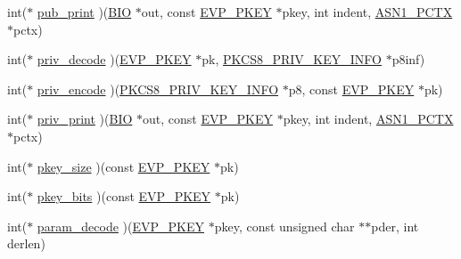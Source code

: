 \begin{DoxyCompactItemize}
\item 
int($\ast$ \hyperlink{structevp__pkey__asn1__method__st_a1ec3f6da35f0cdd500d677123b044d33}{pub\+\_\+print} )(\hyperlink{crypto_2bio_2bio_8h_af3fabae1c9af50b9312cdff41e11d1dd}{B\+IO} $\ast$out, const \hyperlink{crypto_2ossl__typ_8h_a2fca4fef9e4c7a2a739b1ea04acb56ce}{E\+V\+P\+\_\+\+P\+K\+EY} $\ast$pkey, int indent, \hyperlink{crypto_2ossl__typ_8h_a88063a1a0d89cda63e8a53c271225bd3}{A\+S\+N1\+\_\+\+P\+C\+TX} $\ast$pctx)
\item 
int($\ast$ \hyperlink{structevp__pkey__asn1__method__st_a2744e6bc2473d3d562cfba707a35e617}{priv\+\_\+decode} )(\hyperlink{crypto_2ossl__typ_8h_a2fca4fef9e4c7a2a739b1ea04acb56ce}{E\+V\+P\+\_\+\+P\+K\+EY} $\ast$pk, \hyperlink{crypto_2ossl__typ_8h_ab3798ffddfb54398657269e656dcf0d3}{P\+K\+C\+S8\+\_\+\+P\+R\+I\+V\+\_\+\+K\+E\+Y\+\_\+\+I\+N\+FO} $\ast$p8inf)
\item 
int($\ast$ \hyperlink{structevp__pkey__asn1__method__st_a87fb532b7fc31dd31a480a66f8a0300e}{priv\+\_\+encode} )(\hyperlink{crypto_2ossl__typ_8h_ab3798ffddfb54398657269e656dcf0d3}{P\+K\+C\+S8\+\_\+\+P\+R\+I\+V\+\_\+\+K\+E\+Y\+\_\+\+I\+N\+FO} $\ast$p8, const \hyperlink{crypto_2ossl__typ_8h_a2fca4fef9e4c7a2a739b1ea04acb56ce}{E\+V\+P\+\_\+\+P\+K\+EY} $\ast$pk)
\item 
int($\ast$ \hyperlink{structevp__pkey__asn1__method__st_ae349b3ea59e0f76e051467114990ff96}{priv\+\_\+print} )(\hyperlink{crypto_2bio_2bio_8h_af3fabae1c9af50b9312cdff41e11d1dd}{B\+IO} $\ast$out, const \hyperlink{crypto_2ossl__typ_8h_a2fca4fef9e4c7a2a739b1ea04acb56ce}{E\+V\+P\+\_\+\+P\+K\+EY} $\ast$pkey, int indent, \hyperlink{crypto_2ossl__typ_8h_a88063a1a0d89cda63e8a53c271225bd3}{A\+S\+N1\+\_\+\+P\+C\+TX} $\ast$pctx)
\item 
int($\ast$ \hyperlink{structevp__pkey__asn1__method__st_ae7d7e837164cb9faaf4f5fee73be26b0}{pkey\+\_\+size} )(const \hyperlink{crypto_2ossl__typ_8h_a2fca4fef9e4c7a2a739b1ea04acb56ce}{E\+V\+P\+\_\+\+P\+K\+EY} $\ast$pk)
\item 
int($\ast$ \hyperlink{structevp__pkey__asn1__method__st_ace4959fec88f00dc280d3bca7376e3db}{pkey\+\_\+bits} )(const \hyperlink{crypto_2ossl__typ_8h_a2fca4fef9e4c7a2a739b1ea04acb56ce}{E\+V\+P\+\_\+\+P\+K\+EY} $\ast$pk)
\item 
int($\ast$ \hyperlink{structevp__pkey__asn1__method__st_ae30b361ec352090eb78a684cfd1b561a}{param\+\_\+decode} )(\hyperlink{crypto_2ossl__typ_8h_a2fca4fef9e4c7a2a739b1ea04acb56ce}{E\+V\+P\+\_\+\+P\+K\+EY} $\ast$pkey, const unsigned char $\ast$$\ast$pder, int derlen)
\item 
$$
\end{DoxyCompactItemize}
